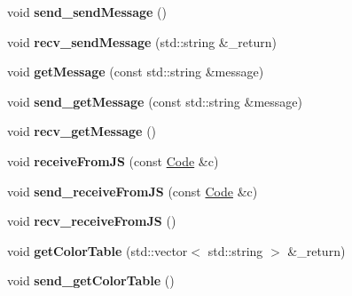 \begin{DoxyCompactItemize}
\mbox{\label{classMARS_1_1MARSClient_a86292876f325ea090b85fc1a50286636}} 
void {\bfseries send\+\_\+send\+Message} ()
\item 
\mbox{\label{classMARS_1_1MARSClient_a9fae4d89950fea72ffb838afb1e6c1f8}} 
void {\bfseries recv\+\_\+send\+Message} (std\+::string \&\+\_\+return)
\item 
\mbox{\label{classMARS_1_1MARSClient_a5b57bfe2de3bb1ac16f4bfb2f25ffad5}} 
void {\bfseries get\+Message} (const std\+::string \&message)
\item 
\mbox{\label{classMARS_1_1MARSClient_a08dce57f389f3a1f1ad27b7425d64f25}} 
void {\bfseries send\+\_\+get\+Message} (const std\+::string \&message)
\item 
\mbox{\label{classMARS_1_1MARSClient_a60f109889c358359d552fd61a5204291}} 
void {\bfseries recv\+\_\+get\+Message} ()
\item 
\mbox{\label{classMARS_1_1MARSClient_ad1ed4cfa23ecdac579eb35b339d4e7d3}} 
void {\bfseries receive\+From\+JS} (const \hyperlink{classMARS_1_1Code}{Code} \&c)
\item 
\mbox{\label{classMARS_1_1MARSClient_a2bf0b3fd8d3e859152f0e981f31be367}} 
void {\bfseries send\+\_\+receive\+From\+JS} (const \hyperlink{classMARS_1_1Code}{Code} \&c)
\item 
\mbox{\label{classMARS_1_1MARSClient_a20686999acd396aa67c614a92ea55a52}} 
void {\bfseries recv\+\_\+receive\+From\+JS} ()
\item 
\mbox{\label{classMARS_1_1MARSClient_a1415d9d072f05b14ff6c166fcaf6d73b}} 
void {\bfseries get\+Color\+Table} (std\+::vector$<$ std\+::string $>$ \&\+\_\+return)
\item 
\mbox{\label{classMARS_1_1MARSClient_a9e1e350e8b588c329054e34868bd8622}} 
void {\bfseries send\+\_\+get\+Color\+Table} ()
\item 
\mbox{\label{classMARS_1_1MARSClient_ab11a8a4cebac9a25ce1e5935c6ae4cff}} 

\end{DoxyCompactItemize}
